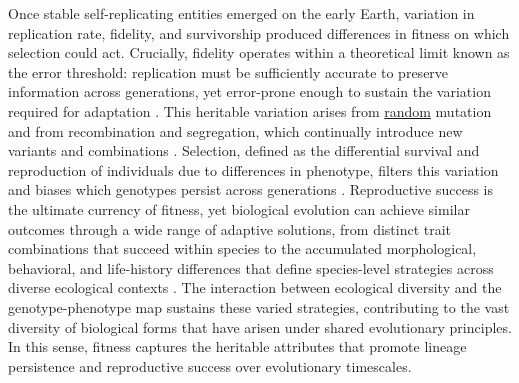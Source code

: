 Once stable self-replicating entities emerged on the early Earth, variation in replication rate, fidelity, and survivorship produced differences in fitness on which selection could act.
Crucially, fidelity operates within a theoretical limit known as the error threshold: replication must be sufficiently accurate to preserve information across generations, yet error-prone enough to sustain the variation required for adaptation \citep{eigen1971selforganization, nowak2006evolutionary}.
This heritable variation arises from \underline{random} mutation and from recombination and segregation, which continually introduce new variants and combinations \citep{gregory2009understanding}.
Selection, defined as the differential survival and reproduction of individuals due to differences in phenotype, filters this variation and biases which genotypes persist across generations \citep{endler1986natural}.
Reproductive success is the ultimate currency of fitness, yet biological evolution can achieve similar outcomes through a wide range of adaptive solutions, from distinct trait combinations that succeed within species to the accumulated morphological, behavioral, and life-history differences that define species-level strategies across diverse ecological contexts \citep{stott2024life}.
The interaction between ecological diversity and the genotype-phenotype map sustains these varied strategies, contributing to the vast diversity of biological forms that have arisen under shared evolutionary principles.
In this sense, fitness captures the heritable attributes that promote lineage persistence and reproductive success over evolutionary timescales.



